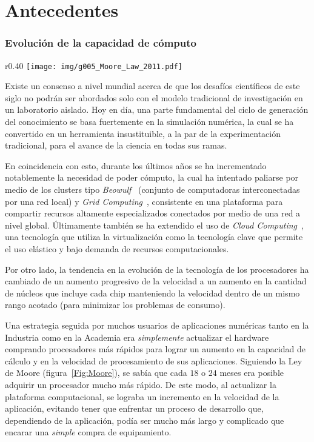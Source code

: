 \documentclass[a4paper,10pt]{article}
\begin{document}
\section*{Antecedentes}

\subsubsection*{Evoluci\'on de la capacidad de c\'omputo}

\begin{wrapfigure}{r}{0.40\textwidth}
\texttt{[image: img/g005\_Moore\_Law\_2011.pdf]}
\caption{Durante a\~nos, las aplicaciones pod\'ian incrementar sus capacidades de c\'omputo en base a la aparici\'on de nuevos procesadores. A partir del a\~no 2005, esta situaci\'on cambi\'o radicalmente.}
\label{Fig:Moore}
\end{wrapfigure}

Existe un consenso a nivel mundial acerca de que los desaf\'ios cient\'ificos de este siglo no podr\'an ser abordados solo con el modelo tradicional de investigaci\'on en un laboratorio aislado.
Hoy en d\'ia, una parte fundamental del ciclo de generaci\'on del conocimiento se basa fuertemente en la simulaci\'on num\'erica, la cual se ha convertido en un herramienta insustituible, a la par de la experimentaci\'on tradicional, para el avance de la ciencia en todas sus ramas.

En coincidencia con esto, durante los \'ultimos a\~nos se ha incrementado notablemente la necesidad de poder c\'omputo, la cual ha intentado paliarse por medio de los clusters tipo \textsl{Beowulf}~\cite{Sterling1995} (conjunto de computadoras interconectadas por una red local) y \textsl{Grid Computing}~\cite{Foster2005}, consistente en una plataforma para compartir recursos altamente especializados conectados por medio de una red a nivel global.
\'Ultimamente tambi\'en se ha extendido el uso de \textsl{Cloud Computing}~\cite{Wernsing2010}, una tecnolog\'ia que utiliza la virtualizaci\'on como la tecnolog\'ia clave que permite el uso el\'astico y bajo demanda de recursos computacionales.

Por otro lado, la tendencia en la evoluci\'on de la tecnolog\'ia de los procesadores ha cambiado de un aumento progresivo de la velocidad a un aumento en la cantidad de n\'ucleos que incluye cada chip manteniendo la velocidad dentro de un mismo rango acotado (para minimizar los problemas de consumo).

Una estrategia seguida por muchos usuarios de aplicaciones num\'ericas tanto en la Industria como en la Academia era \emph{simplemente} actualizar el hardware comprando procesadores m\'as r\'apidos para lograr un aumento en la capacidad de c\'alculo y en la velocidad de procesamiento de sus aplicaciones.
Siguiendo la Ley de Moore (figura~\ref{Fig:Moore}), se sab\'ia que cada $18$ o $24$ meses era posible adquirir un procesador mucho m\'as r\'apido.
De este modo, al actualizar la plataforma computacional, se lograba un incremento en la velocidad de la aplicaci\'on, evitando tener que enfrentar un proceso de desarrollo que, dependiendo de la aplicaci\'on, pod\'ia ser mucho m\'as largo y complicado que encarar una \emph{simple} compra de equipamiento.
\end{document}
